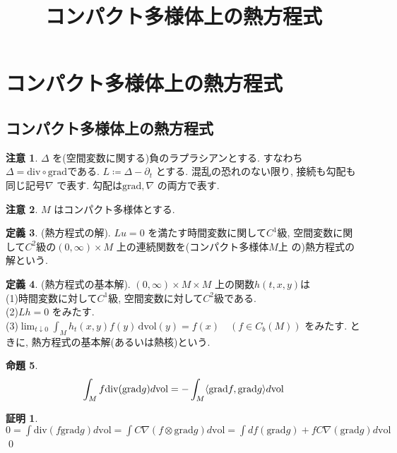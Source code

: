 \documentclass[twocolumn, landscape, a4paper , 8pt, fleqn, titlepage ]{jsarticle}
\title{コンパクト多様体上の熱方程式}
\author{}
\date{}
\theoremstyle{definition}
\newtheorem{dfn}{定義}[section]
\newtheorem{prop}[dfn]{命題}
\newtheorem*{pf*}{証明}
\newtheorem{remark}[dfn]{注意}
\newcommand{\tbra}[1]{\mleft\langle#1\mright\rangle}
\newcommand{\grad}{\textrm{grad}}
\renewcommand{\div}{\textrm{div}}
\newcommand{\vol}{\textrm{vol}}
\renewcommand{\d}{\, \textrm{d} }
\renewcommand{\-}{\hyphen}
\begin{document}
\maketitle

\scriptsize 


\section{コンパクト多様体上の熱方程式}
\subsection{コンパクト多様体上の熱方程式}
\begin{remark}
$\Delta$ を(空間変数に関する)負のラプラシアンとする. すなわち$\Delta = \div\circ \grad$である. $L \coloneqq \Delta - \partial_t$ とする. 混乱の恐れのない限り, 接続も勾配も同じ記号$\nabla$ で表す. 勾配は$\grad, \nabla$ の両方で表す. 
\end{remark}

\begin{remark}
$M$ はコンパクト多様体とする. 
\end{remark}

\begin{dfn}(熱方程式の解). $Lu = 0$ を満たす時間変数に関して$C^1$級, 空間変数に関して$C^2$級の$(0,\infty) \times M$ 上の連続関数を(コンパクト多様体$M$上 の)熱方程式の解という.
\end{dfn}

\begin{dfn}(熱方程式の基本解). $(0, \infty) \times M \times M$ 上の関数$h(t,x,y)$は\\
(1)時間変数に対して$C^1$級, 空間変数に対して$C^2$級である. \\
(2)$Lh = 0$ をみたす.\\
(3)$\lim_{t \downarrow 0} \int_M h_t(x,y)f(y) \d\vol(y) = f(x) \quad (f \in C_b (M))$ をみたす.
ときに, 熱方程式の基本解(あるいは熱核)という. 
\end{dfn}

\begin{prop}
\begin{align*}  \int_M f \div(\grad g) d \vol = - \int_M \tbra{\grad f, \grad g} d \vol \end{align*}
\end{prop}
\begin{pf*}
$0 = \int \div (f \grad g) d\vol = \int C \nabla (f \otimes \grad g) d \vol = \int df(\grad g) + f C \nabla (\grad g) d \vol $
\qed
\end{pf*}
\end{document}
